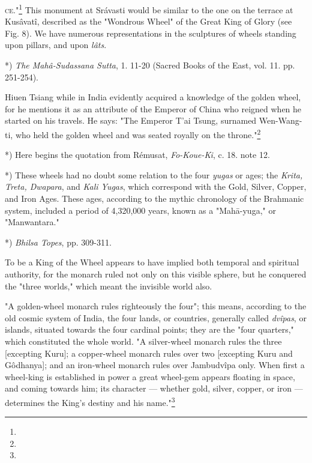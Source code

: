 \documentclass[a4paper, 11pt, oneside, polutonikogreek, english]{article}
\begin{document}
\textsc{ce}."\footnote{} This monument at Srávasti would be similar to the one on the terrace at Kusâvatî, described as the "Wondrous Wheel" of the Great King of Glory (see Fig. 8). We have numerous representations in the sculptures of wheels standing upon pillars, and upon \emph{lâts}.

*) \emph{The Mahâ-Sudassana Sutta}, 1. 11-20 (Sacred Books of the East, vol. 11. pp. 251-254).

Hiuen Tsiang while in India evidently acquired a knowledge of the golden wheel, for he mentions it as an attribute of the Emperor of China who reigned when he started on his travels. He says: "The Emperor T'ai Tsung, surnamed Wen-Wang-ti, who held the golden wheel and was seated royally on the throne."\footnote{}

*) Here begins the quotation from Rémusat, \emph{Fo-Koue-Ki}, c. 18. note 12.

*) These wheels had no doubt some relation to the four \emph{yugas} or ages; the \emph{Krita, Treta, Dwapara}, and \emph{Kali Yugas}, which correspond with the Gold, Silver, Copper, and Iron Ages. These ages, according to the mythic chronology of the Brahmanic system, included a period of 4,320,000 years, known as a "Mahā-yuga," or "Manwantara."

*) \emph{Bhilsa Topes}, pp. 309-311.

To be a King of the Wheel appears to have implied both temporal and spiritual authority, for the monarch ruled not only on this visible sphere, but he conquered the "three worlds," which meant the invisible world also.

"A golden-wheel monarch rules righteously the four"; this means, according to the old cosmic system of India, the four lands, or countries, generally called \emph{dvîpas}, or islands, situated towards the four cardinal points; they are the "four quarters," which constituted the whole world. "A silver-wheel monarch rules the three [excepting Kuru]; a copper-wheel monarch rules over two [excepting Kuru and Gôdhanya]; and an iron-wheel monarch rules over Jambudvîpa only. When first a wheel-king is established in power a great wheel-gem appears floating in space, and coming towards him; its character --- whether gold, silver, copper, or iron --- determines the King's destiny and his name."\footnote{}
\end{document}
